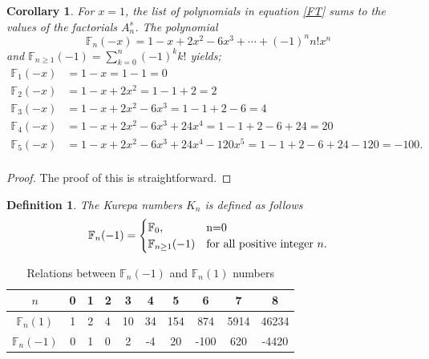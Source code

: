 \documentclass[pdflatex,sn-mathphys-num]{sn-jnl}%
\newtheorem{definition}{Definition}
\newtheorem{corollary}{Corollary}
\theoremstyle{thmstyleone}%
\theoremstyle{thmstyletwo}%
\theoremstyle{thmstylethree}%
\begin{document}
\begin{corollary}
    For $x=1$, the list of polynomials in equation \ref{FT} sums to the values of the factorials $A_n^s$. The polynomial
    $$\mathbb{F}_{n}(-x)= 1-x+2x^2-6x^3+\cdots+(-1)^nn!x^n$$ and 
    $\mathbb{F}_{n\geq1}(-1) = \sum_{k=0}^n (-1)^k k! $ yields; 
\begin{align*}\label{PF}
\mathbb{F}_{1}(-x) &= 1 - x=1-1=0\\  \nonumber
\mathbb{F}_{2}(-x) &= 1 - x + 2x^2=1-1+2=2\\  \nonumber
\mathbb{F}_{3}(-x) &= 1 - x + 2x^2 - 6x^3=1-1+2-6=4\\  \nonumber
\mathbb{F}_{4}(-x) &= 1 - x + 2x^2 - 6x^3 + 24x^4=1-1+2-6+24=20\\  \nonumber
\mathbb{F}_{5}(-x) &= 1 - x + 2x^2 - 6x^3 + 24x^4 - 120x^5=1-1+2-6+24-120=-100.\\  
\end{align*}  
\end{corollary}
\begin{proof}
    The proof of this is straightforward.
\end{proof}





\begin{definition}
    The Kurepa numbers $K_n$ is defined as follows
    \begin{equation*}
\mathbb{F}_n(-1)=
\begin{cases}
	 \text{$\mathbb{F}_{0}$,}  & $\text{n=0}$ \\
	\text{$\mathbb{F}_{n\geq1}(-1)$}   & \text{for all positive integer $n$}.
\end{cases}
 \end{equation*}
    
\end{definition}


\begin{table}[!ht]\label{T}
    \centering
    \begin{tabular}{|c|c|c|a|c|c|c|c|c|c|}\hline 
        $n$& 0 & 1 & 2 & 3 &4  &5  & 6 & 7 &8 \\\hline 
        $\mathbb{F}_{n}(1)$ & 1 & 2 & 4 & 10 & 34 & 154 & 874 & 5914 &46234 \\\hline
         $\mathbb{F}_{n}(-1)$ & 0 &1  & 0 & 2 &-4 &20& -100 & 620 &-4420 \\\hline
    \end{tabular}
    \caption{Relations between $\mathbb{F}_{n}(-1)$ and $\mathbb{F}_{n}(1)$ numbers  }
    \label{table 8}
\end{table}
\end{document}
